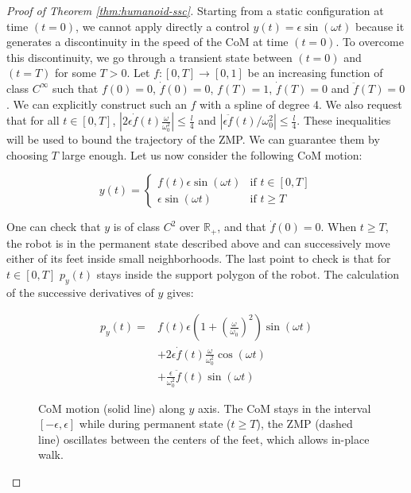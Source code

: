\begin{proof}[Proof of Theorem \ref{thm:humanoid-ssc}]
Starting from a static configuration at time $(t=0)$, we cannot apply
directly a control $y(t) = \epsilon \sin(\omega t)$ because it
generates a discontinuity in the speed of the CoM at time $(t=0)$. To
overcome this discontinuity, we go through a transient state between
$(t=0)$ and $(t=T)$ for some $T >0$. Let $f:[0,T] \rightarrow [0,1]$
be an increasing function of class $C^\infty$ such that $f(0) = 0$,
$\dot{f}(0) = 0$, $f(T) = 1$, $\dot{f}(T) = 0$ and $\ddot{f}(T) = 0$.
We can explicitly construct such an $f$ with a spline of degree 4.  We
also request that for all $t \in [0,T]$,
$|2\epsilon\dot{f}(t)\frac{\omega}{\omega_0^2}| \leq \frac{l}{4}$ and
$|\epsilon\ddot{f}(t)/\omega_0^2| \leq \frac{l}{4}$.  These
inequalities will be used to bound the trajectory of the ZMP. We can
guarantee them by choosing $T$ large enough. Let us now consider the
following CoM motion:

\[
y(t) = \left\{
\begin{array}{ll}
f(t)\epsilon\sin(\omega t) 
& \text{if } t\in [0,T]
\\ 
\epsilon\sin(\omega t) 
& \text{if } t \geq T \end{array}
\right.
\]

One can check that $y$ is of class $C^2$ over $\mathbb{R}_+$, and that
$\dot{f}(0) = 0$. When $t\geq T$, the robot is in the permanent state
described above and can successively move either of its feet inside
small neighborhoods.  The last point to check is that for $t \in
[0,T]$ $p_y(t)$ stays inside the support polygon of the robot. The
calculation of the successive derivatives of $y$ gives:

\[
\begin{array}{cl}
p_y(t) = &  f(t) \epsilon (1 + \left(\frac{\omega}{\omega_0}\right)^2)
\sin (\omega  t) \\ &  + 2\epsilon \dot{f}(t)\frac{\omega}{\omega_0^2}
\cos  (\omega t)  \\ &  +  \frac{\epsilon}{\omega_0^2}\ddot{f}(t) \sin
(\omega t)
\end{array}
\]

\begin{figure}
\centering


\caption{CoM motion (solid line) along $y$ axis.  The CoM stays in the
  interval $[-\epsilon,\epsilon]$ while during permanent state ($t
  \geq T$), the ZMP (dashed line) oscillates between the centers of
  the feet, which allows in-place walk.}
\label{fig:zmp-inplace}
\end{figure}


\end{proof}
